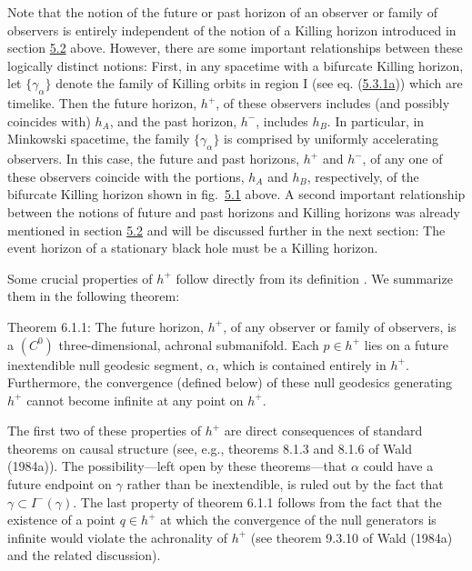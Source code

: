 \documentclass[11pt,a4paper]{article}
\begin{document}
Note that the notion of the future or past horizon of an observer or family of observers is entirely independent of the notion of a Killing horizon introduced in section \hyperlink{sec:5.2}{5.2} above. However, there are some important relationships between these logically distinct notions: First, in any spacetime with a bifurcate Killing horizon, let \(\{\gamma_{\alpha}\}\) denote the family of Killing orbits in region I (see eq. (\hyperref[eq:5.3.1a]{5.3.1a})) which are timelike. Then the future horizon, \(h^+\), of these observers includes (and possibly coincides with) \(h_A\), and the past horizon, \(h^-\), includes \(h_B\). In particular, in Minkowski spacetime, the family \(\{\gamma_\alpha\}\) is comprised by uniformly accelerating observers. In this case, the future and past horizons, \(h^+\) and \(h^-\), of any one of these observers coincide with the portions, \(h_A\) and \(h_B\), respectively, of the bifurcate Killing horizon shown in fig.~\hyperref[fig:5.1]{5.1} above. A second important relationship between the notions of future and past horizons and Killing horizons was already mentioned in section \hyperlink{sec:5.2}{5.2} and will be discussed further in the next section: The event horizon of a stationary black hole must be a Killing horizon.

Some crucial properties of \(h^+\) follow directly from its definition\hypertarget{source-148}{} . We summarize them in the following theorem:

Theorem 6.1.1: The future horizon, \(h^+\), of any observer or family of observers, is a \((C^0)\) three-dimensional, achronal submanifold. Each \(p \in h^+\) lies on a future inextendible null geodesic segment, \(\alpha\), which is contained entirely in \(h^+\). Furthermore, the convergence (defined below) of these null geodesics generating \(h^+\) cannot become infinite at any point on \(h^+\).

The first two of these properties of \(h^+\) are direct consequences of standard theorems on causal structure (see, e.g., theorems 8.1.3 and 8.1.6 of Wald (1984a)). The possibility---left open by these theorems---that \(\alpha\) could have a future endpoint on \(\gamma\) rather than be inextendible, is ruled out by the fact that \(\gamma \subset I^-(\gamma)\). The last property of theorem 6.1.1 follows from the fact that the existence of a point \(q \in h^+\) at which the convergence of the null generators is infinite would violate the achronality of \(h^+\) (see theorem 9.3.10 of Wald (1984a) and the related discussion).
\end{document}
